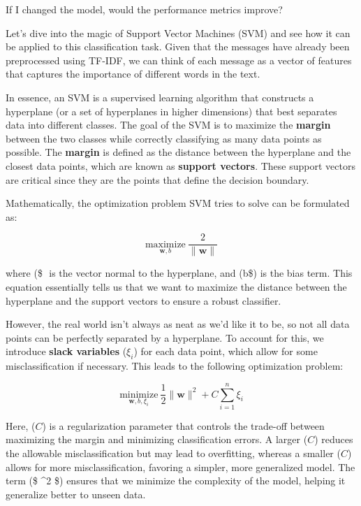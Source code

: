 \documentclass[11pt]{article}
\begin{document}
If I changed the model, would the performance metrics improve?

Let's dive into the magic of Support Vector Machines (SVM) and see how
it can be applied to this classification task. Given that the messages
have already been preprocessed using TF-IDF, we can think of each
message as a vector of features that captures the importance of
different words in the text.

In essence, an SVM is a supervised learning algorithm that constructs a
hyperplane (or a set of hyperplanes in higher dimensions) that best
separates data into different classes. The goal of the SVM is to
maximize the \textbf{margin} between the two classes while correctly
classifying as many data points as possible. The \textbf{margin} is
defined as the distance between the hyperplane and the closest data
points, which are known as \textbf{support vectors}. These support
vectors are critical since they are the points that define the decision
boundary.

Mathematically, the optimization problem SVM tries to solve can be
formulated as:

\[
\underset{\mathbf{w}, b}{\text{maximize}} \ \frac{2}{\|\mathbf{w}\|}
\]

where (\$
\(\) is the vector normal to the hyperplane, and (\)b\$) is the bias
term. This equation essentially tells us that we want to maximize the
distance between the hyperplane and the support vectors to ensure a
robust classifier.

However, the real world isn't always as neat as we'd like it to be, so
not all data points can be perfectly separated by a hyperplane. To
account for this, we introduce \textbf{slack variables} (\(\xi_i\)) for
each data point, which allow for some misclassification if necessary.
This leads to the following optimization problem:

\[
\underset{\mathbf{w}, b, \xi_i}{\text{minimize}} \ \frac{1}{2} \|\mathbf{w}\|^2 + C \sum_{i=1}^{n} \xi_i
\]

Here, (\(C\)) is a regularization parameter that controls the trade-off
between maximizing the margin and minimizing classification errors. A
larger (\(C\)) reduces the allowable misclassification but may lead to
overfitting, whereas a smaller (\(C\)) allows for more
misclassification, favoring a simpler, more generalized model. The term
(\$ \textbar{}\textbar\^{}2 \$) ensures that we
minimize the complexity of the model, helping it generalize better to
unseen data.
\end{document}
